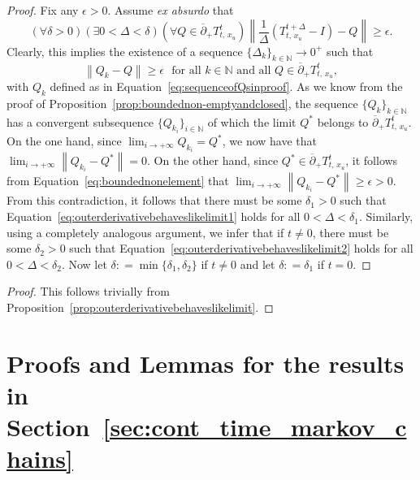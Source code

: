 \documentclass[10pt,a4paper]{paper}
\theoremstyle{definition}
\newcommand{\nats}{\mathbb{N}}
\newcommand{\norm}[1]{\left\lVert #1 \right\rVert}
\newcommand{\coloneqq}{:\!=}
\begin{document}
\propouterderivativebehaveslikelimit*
\begin{proof}
Fix any $\epsilon>0$.
Assume \emph{ex absurdo} that
\begin{equation*}
(\forall\delta>0)(\exists0<\Delta<\delta)
(\forall Q\in\overline{\partial}_{+}
{T^t_{t,\,x_u}})
\norm{\frac{1}{\Delta}
(T^{t+\Delta}_{t,\,x_u}-I)-Q}\geq\epsilon.
\end{equation*}
Clearly, this implies the existence of a sequence $\{\Delta_k\}_{k\in\nats}\to0^+$ such that
\begin{equation}\label{eq:boundednonelement}
\norm{Q_k-Q}\geq\epsilon
\text{~~for all $k\in\nats$ and all $Q\in\overline{\partial}_{+}
{T^t_{t,\,x_u}}$},
\end{equation}
with $Q_k$ defined as in Equation~\eqref{eq:sequenceofQsinproof}. As we know from the proof of Proposition~\ref{prop:boundednon-emptyandclosed}, the sequence $\{Q_k\}_{k\in\nats}$ has a convergent subsequence $\{Q_{k_i}\}_{i\in\nats}$ of which the limit $Q^*$ belongs to $\overline{\partial}_{+}
{T^t_{t,\,x_u}}$. On the one hand, since $\lim_{i\to+\infty}Q_{k_i}=Q^*$, we now have that $\lim_{i\to+\infty}\norm{Q_{k_i}-Q^*}=0$. On the other hand, since $Q^*\in\overline{\partial}_{+}
{T^t_{t,\,x_u}}$, it follows from Equation~\eqref{eq:boundednonelement} that $\lim_{i\to+\infty}\norm{Q_{k_i}-Q^*}\geq\epsilon>0$. From this contradiction, it follows that there must be some $\delta_1>0$ such that Equation~\eqref{eq:outerderivativebehaveslikelimit1} holds for all $0<\Delta<\delta_1$. Similarly, using a completely analogous argument, we infer that if $t\neq0$, there must be some $\delta_2>0$ such that Equation~\eqref{eq:outerderivativebehaveslikelimit2} holds for all $0<\Delta<\delta_2$. Now let $\delta\coloneqq\min\{\delta_1,\delta_2\}$ if $t\neq0$ and let $\delta\coloneqq\delta_1$ if $t=0$.
\end{proof}

\coroloutersingleton*
\begin{proof}
This follows trivially from Proposition~\ref{prop:outerderivativebehaveslikelimit}.
\end{proof}

\section{Proofs and Lemmas for the results in Section~\ref{sec:cont_time_markov_chains}}
\end{document}
